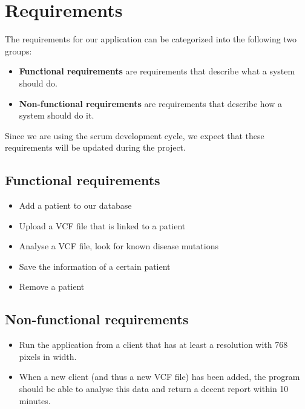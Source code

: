 \section{Requirements}
The requirements for our application can be categorized into the following two groups:
\begin{itemize}
\item \textbf{Functional requirements} are requirements that describe what a system should do.
\item \textbf{Non-functional requirements} are requirements that describe how a system should do it.
\end{itemize}
Since we are using the scrum development cycle, we expect that these requirements will be updated during the project.  

\subsection{Functional requirements}
\begin{itemize}
\item Add a patient to our database 
\item Upload a VCF file that is linked to a patient
\item Analyse a VCF file, look for known disease mutations
\item Save the information of a certain patient
\item Remove a patient

\end{itemize}

\subsection{Non-functional requirements}
\begin{itemize}
\item Run the application from a client that has at least a resolution with 768 pixels in width.
\item When a new client (and thus a new VCF file) has been added, the program should be able to analyse this data and return a decent report within 10 minutes. 
\end{itemize} \newpage

